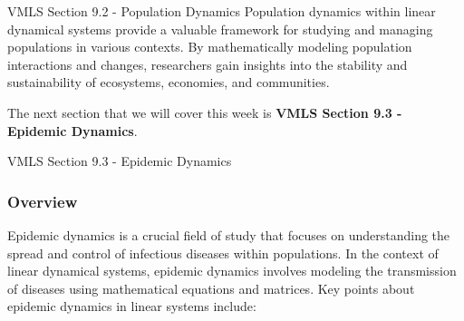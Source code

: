 \begin{notes}{VMLS Section 9.2 - Population Dynamics}
    Population dynamics within linear dynamical systems provide a valuable framework for studying and managing populations in various contexts. By mathematically modeling population interactions and 
    changes, researchers gain insights into the stability and sustainability of ecosystems, economies, and communities.
\end{notes}

The next section that we will cover this week is \textbf{VMLS Section 9.3 - Epidemic Dynamics}.

\begin{notes}{VMLS Section 9.3 - Epidemic Dynamics}
    \subsubsection*{Overview}

    Epidemic dynamics is a crucial field of study that focuses on understanding the spread and control of infectious diseases within populations. In the context of linear dynamical systems, epidemic 
    dynamics involves modeling the transmission of diseases using mathematical equations and matrices. Key points about epidemic dynamics in linear systems include:


\end{notes}
